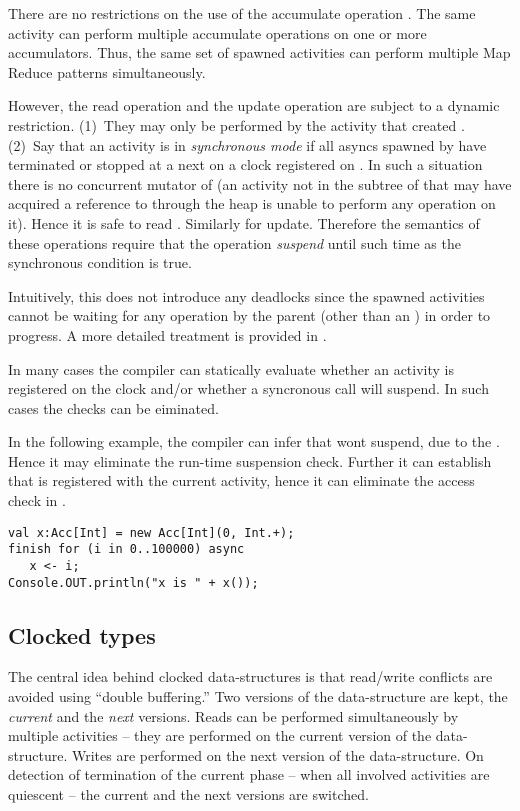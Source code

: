 There are no restrictions on the use of the accumulate operation
. The same activity can perform multiple accumulate
operations on one or more accumulators. Thus, the same set of spawned
activities can perform multiple Map Reduce patterns simultaneously.

However, the read operation  and the update operation
 are subject to a dynamic restriction. (1)~They may only
be performed by the activity that created . (2)~Say that an
activity  is in {\em synchronous mode} if all asyncs spawned
by  have terminated or stopped at a next on a clock registered
on .  In such a situation there is no concurrent mutator of
 (an activity not in the subtree of  that may have
acquired a reference to  through the heap is unable to perform
any operation on it). Hence it is safe to read . Similarly for
update. Therefore the semantics of these operations require that the
operation {\em suspend} until such time as the synchronous condition
is true.

Intuitively, this does not introduce any deadlocks since the
spawned activities cannot be waiting for any operation by the parent
(other than an ) in order to progress. A more detailed
treatment is provided in .


In many cases the compiler can statically evaluate whether an activity
is registered on the clock and/or whether a syncronous call will
suspend. In such cases the checks can be eiminated.
\begin{example}
In the following example, the compiler can infer that  wont suspend, due to
the . Hence it may eliminate the run-time suspension
check. Further it can establish that  is 
registered with the current activity, hence it can eliminate the
access check in .
\begin{lstlisting}
val x:Acc[Int] = new Acc[Int](0, Int.+);
finish for (i in 0..100000) async
   x <- i;
Console.OUT.println("x is " + x());
\end{lstlisting}

\end{example}

\subsection{Clocked types}

The central idea behind clocked data-structures is that read/write
conflicts are avoided using ``double buffering.'' Two versions of the
data-structure are kept, the {\em current} and the {\em next}
versions. Reads can be performed simultaneously by multiple activities
-- they are performed on the current version of the
data-structure. Writes are performed on the next version of the
data-structure. On detection of termination of the current phase --
when all involved activities are quiescent -- the current and the next
versions are switched.

